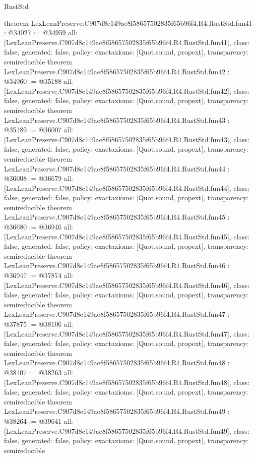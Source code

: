\begin{lexlean}{RustStd}
\begin{coremodule}
{}
theorem LexLeanPreserve.C907d8c149ae8f58657502835f65b96f4.R4.RustStd.fun41 : @34027 := @34959 {
  all: [LexLeanPreserve.C907d8c149ae8f58657502835f65b96f4.R4.RustStd.fun41],
  class: false,
  generated: false,
  policy: exact{axioms: [Quot.sound, propext]},
  transparency: semireducible
}
theorem LexLeanPreserve.C907d8c149ae8f58657502835f65b96f4.R4.RustStd.fun42 : @34960 := @35188 {
  all: [LexLeanPreserve.C907d8c149ae8f58657502835f65b96f4.R4.RustStd.fun42],
  class: false,
  generated: false,
  policy: exact{axioms: [Quot.sound, propext]},
  transparency: semireducible
}
theorem LexLeanPreserve.C907d8c149ae8f58657502835f65b96f4.R4.RustStd.fun43 : @35189 := @36007 {
  all: [LexLeanPreserve.C907d8c149ae8f58657502835f65b96f4.R4.RustStd.fun43],
  class: false,
  generated: false,
  policy: exact{axioms: [Quot.sound, propext]},
  transparency: semireducible
}
theorem LexLeanPreserve.C907d8c149ae8f58657502835f65b96f4.R4.RustStd.fun44 : @36008 := @36679 {
  all: [LexLeanPreserve.C907d8c149ae8f58657502835f65b96f4.R4.RustStd.fun44],
  class: false,
  generated: false,
  policy: exact{axioms: [Quot.sound, propext]},
  transparency: semireducible
}
theorem LexLeanPreserve.C907d8c149ae8f58657502835f65b96f4.R4.RustStd.fun45 : @36680 := @36946 {
  all: [LexLeanPreserve.C907d8c149ae8f58657502835f65b96f4.R4.RustStd.fun45],
  class: false,
  generated: false,
  policy: exact{axioms: [Quot.sound, propext]},
  transparency: semireducible
}
theorem LexLeanPreserve.C907d8c149ae8f58657502835f65b96f4.R4.RustStd.fun46 : @36947 := @37874 {
  all: [LexLeanPreserve.C907d8c149ae8f58657502835f65b96f4.R4.RustStd.fun46],
  class: false,
  generated: false,
  policy: exact{axioms: [Quot.sound, propext]},
  transparency: semireducible
}
theorem LexLeanPreserve.C907d8c149ae8f58657502835f65b96f4.R4.RustStd.fun47 : @37875 := @38106 {
  all: [LexLeanPreserve.C907d8c149ae8f58657502835f65b96f4.R4.RustStd.fun47],
  class: false,
  generated: false,
  policy: exact{axioms: [Quot.sound, propext]},
  transparency: semireducible
}
theorem LexLeanPreserve.C907d8c149ae8f58657502835f65b96f4.R4.RustStd.fun48 : @38107 := @38263 {
  all: [LexLeanPreserve.C907d8c149ae8f58657502835f65b96f4.R4.RustStd.fun48],
  class: false,
  generated: false,
  policy: exact{axioms: [Quot.sound, propext]},
  transparency: semireducible
}
theorem LexLeanPreserve.C907d8c149ae8f58657502835f65b96f4.R4.RustStd.fun49 : @38264 := @39641 {
  all: [LexLeanPreserve.C907d8c149ae8f58657502835f65b96f4.R4.RustStd.fun49],
  class: false,
  generated: false,
  policy: exact{axioms: [Quot.sound, propext]},
  transparency: semireducible
}
\end{coremodule}
\end{lexlean}
